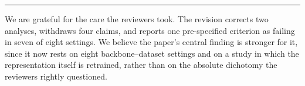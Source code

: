 \documentclass[11pt,a4paper]{article}
\begin{document}
\vspace{0.4em}
\noindent\textcolor{rulegrey}{\rule{\textwidth}{1pt}}

We are grateful for the care the reviewers took. The revision corrects two analyses, withdraws four
claims, and reports one pre-specified criterion as failing in seven of eight settings. We believe
the paper's central finding is stronger for it, since it now rests on eight backbone--dataset
settings and on a study in which the representation itself is retrained, rather than on the
absolute dichotomy the reviewers rightly questioned.
\end{document}
